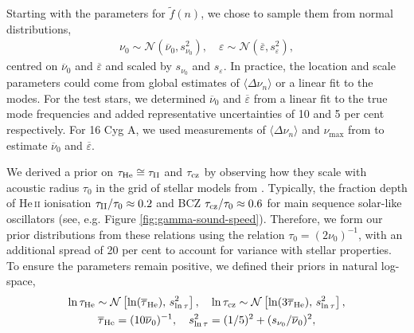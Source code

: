 Starting with the parameters for \(\tilde{f}(n)\), we chose to sample them from normal distributions,
%
\begin{gather*}
    \nu_0 \sim \mathcal{N}(\overline{\nu}_0, s_{\nu_0}^2), \quad \varepsilon \sim \mathcal{N}(\overline{\varepsilon}, s_\varepsilon^2),%
\end{gather*}
%
centred on \(\overline{\nu}_0\) and \(\overline{\varepsilon}\) and scaled by \(s_{\nu_0}\) and \(s_\varepsilon\). In practice, the location and scale parameters could come from global estimates of \(\langle\Delta\nu_n\rangle\) or a linear fit to the modes. For the test stars, we determined \(\overline{\nu}_0\) and \(\overline{\varepsilon}\) from a linear fit to the true mode frequencies and added representative uncertainties of 10 and 5 per cent respectively. For 16 Cyg A, we used measurements of \(\langle\Delta\nu_n\rangle\) and \(\nu_{\max}\) from \citet{Lund.SilvaAguirre.ea2017} to estimate \(\overline{\nu}_0\) and \(\overline{\varepsilon}\).


We derived a prior on \(\tau_{{\mathrm{He}}} \cong \tau_{{\mathrm{II}}}\) and \(\tau_{{\mathrm{cz}}}\) by observing how they scale with acoustic radius \(\tau_0\) in the grid of stellar models from \citep{Lyttle.Davies.ea2021}. Typically, the fraction depth of He\,\textsc{ii} ionisation \(\tau_{{\mathrm{II}}}/\tau_0 \approx 0.2\) and BCZ \(\tau_{{\mathrm{cz}}}/\tau_0 \approx 0.6\) for main sequence solar-like oscillators (see, e.g. Figure \ref{fig:gamma-sound-speed}). Therefore, we form our prior distributions from these relations using the relation \({\tau}_0 = (2\nu_0)^{-1}\), with an additional spread of 20 per cent to account for variance with stellar properties. To ensure the parameters remain positive, we defined their priors in natural log-space,
%
\begin{gather*}
    \ln\tau_{{\mathrm{He}}} \sim \mathcal{N}\left[ \ln(\overline{\tau}_{{\mathrm{He}}}), \, s_{\ln\tau}^2 \right], \quad \ln\tau_{{\mathrm{cz}}} \sim \mathcal{N}\left[\ln(3\overline{\tau}_{{\mathrm{He}}}), \, s_{\ln\tau}^2 \right],\\
    \overline{\tau}_{{\mathrm{He}}} = (10 \overline{\nu}_0)^{-1}, \quad s_{\ln\tau}^2 = (1/5)^2 + (s_{\nu_0}/\overline{\nu}_0)^2,
\end{gather*}

